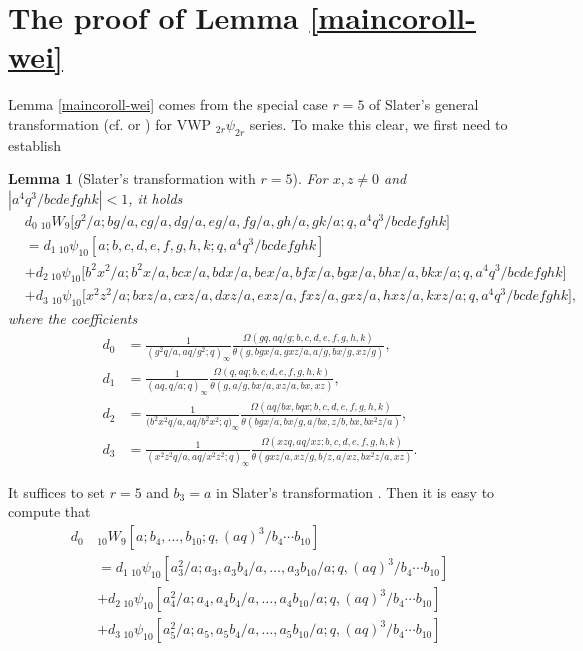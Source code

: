 \documentclass[xits,review,sort&compress]{elsarticle}
\newtheorem{yl}[dl]{Lemma}
\numberwithin{equation}{section}
\def\pf{\noindent {\it Proof.} }
\begin{document}
\section{The proof of Lemma \ref{maincoroll-wei}}  Lemma \ref{maincoroll-wei} comes from the special case $r=5$ of  Slater's   general transformation (cf. \cite{slater} or \cite[Eq. (5.5.2)]{10}) for VWP ${}_{2r}\psi_{2r}$ series. To make this clear, we first  need to establish
\begin{yl}[Slater's transformation with $r=5$]\label{slatermaintheme}For $x,z\neq  0$ and
$|a^4q^3/bcdefghk|<1$,  it holds
\begin{align}&d_0~{}_{10}W_{9}\big[g^2/a;bg/a,cg/a,dg/a,eg/a,fg/a,
gh/a,gk/a;q,a^4 q^3/bcdefghk\big]\nonumber\\
&=d_1\,{}_{10}\psi_{10}[a;b,c,d,e,f,g,h,k;q,a^4 q^3/bcdefghk]\label{yyy}\\
&+d_2\,{}_{10}\psi_{10}\big[b^2 x^2/a;b^2 x/a,b c x/a,b d x/a,b e x/a,b f x/a,b g x/a,b h x/a,b k x/a;q,a^4 q^3/bcdefghk\big]\nonumber\\
&+d_3~{}_{10}\psi_{10}\big[x^2z^2/a;bx z/a,cx z/a,dx z/a,ex z/a,fx z/a,gx z/a,
hx z/a,kx z/a;q,a^4 q^3/bcdefghk\big],\nonumber
\end{align}
where the coefficients
\begin{subequations}\label{wwwww}
\begin{align}
d_0&=\frac{1}{(g^2 q/a,aq/g^2;q)_{\infty}}\frac{\Omega(gq,aq/g;b,c,d,e,f,g,h,k)}
{\theta(g,b g x/a,g x z/a,a/g,b x/g,x z/g)},\label{16a}\\
  d_1 &= \frac{1}{(a q,q/a;q)_{\infty}}\frac{\Omega(q,aq;b,c,d,e,f,g,h,k)}
  {\theta(g,a/g,b x/a,x z/a,b x,x z)},\\
  d_2 &=\frac{1}{\big(b^2x^2q/a,a q/b^2x^2;q\big)_{\infty}}
  \frac{\Omega(aq/bx,bqx;b,c,d,e,f,g,h,k)}{\theta(b g x/a, b x/g, a/bx, z/b, b x, b x^2 z/a)},\\
  d_3 &=\frac{1}{(x^2 z^2q/a,a q/x^2 z^2;q)_{\infty}}\frac{\Omega(xzq,aq/xz;b,c,d,e,f,g,h,k)}{
  \theta(g x z/a,x z/g,b/z,a/x z,b x^2 z/a,x z)}.
\end{align}
\end{subequations}
\end{yl}
\pf It suffices to set $r=5$ and $b_3=a$ in Slater's transformation   \cite[Eq. (5.5.2)]{10}. Then it is easy to compute that
\begin{align}
d_0\,&{}_{10}W_{9}\left[a; b_{4}, \ldots, b_{10}; q, (aq)^{3}/b_{4}\cdots b_{10}\right]\nonumber\\
&=d_1\, {}_{10}\psi_{10}\left[a_3^2/a; a_{3}, a_{3} b_{4} / a,\ldots, a_{3} b_{10} /a; q, (aq)^{3}/b_{4}\cdots b_{10}\right]\nonumber\\
&+d_2\,
{}_{10}\psi_{10}\left[a_4^2/a;a_{4},  a_{4} b_{4} / a,\ldots, a_{4} b_{10} / a; q, (aq)^{3}/b_{4}\cdots b_{10}\right]\nonumber\\
&+d_3\, {}_{10}\psi_{10}\left[a_5^2/a; a_{5}, a_{5} b_{4} / a, \ldots,a_{5} b_{10} /a; q, (aq)^{3}/b_{4}\cdots b_{10}\right]\label{zzz}
\end{align}
\end{document}
